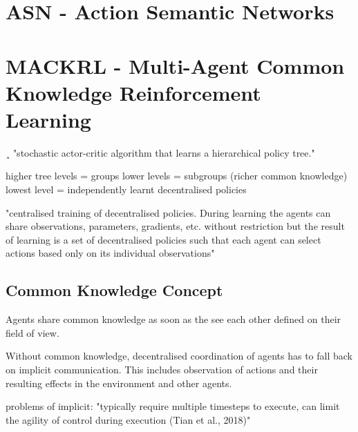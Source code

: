 \section{ASN - Action Semantic Networks}
%
%
%
\section{MACKRL - Multi-Agent Common Knowledge Reinforcement Learning}
¸
"stochastic actor-critic algorithm that learns a hierarchical policy tree."

higher tree levels = groups
lower levels = subgroups (richer common knowledge)
lowest level = independently learnt decentralised policies


"centralised training of decentralised policies.
During learning the agents can share observations, parameters, gradients, etc. without restriction but
the result of learning is a set of decentralised policies such that each agent can select actions based
only on its individual observations"

\subsection{Common Knowledge Concept}
Agents share common knowledge as soon as the see each other defined on their field of view.

Without common knowledge, decentralised coordination of agents has to fall back on implicit communication. This includes observation of actions and their resulting effects in the environment and other agents.

problems of implicit:
"typically
require multiple timesteps to execute, can limit the agility of control during execution (Tian et al.,
2018)"